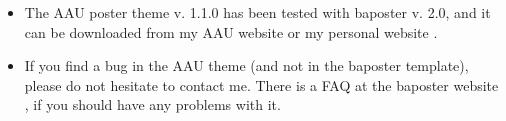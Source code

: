   \begin{itemize}
  	\item The AAU poster theme v. 1.1.0 has been tested with baposter v. 2.0, and it can be downloaded from my AAU website \cite{jknaau} or my personal website \cite{jknsqrt-1}.
  	\item If you find a bug in the AAU theme (and not in the baposter template), please do not hesitate to contact me. There is a FAQ at the baposter website \cite{baposter}, if you should have any problems with it.
  \end{itemize}